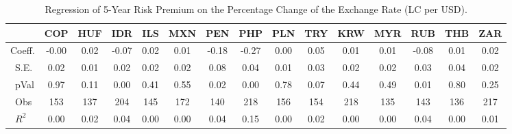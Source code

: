 \begin{table}
	\centering
\begin{tabular}{l|cccccccccccccc}
\toprule
&\textbf{COP}&\textbf{HUF}&\textbf{IDR}&\textbf{ILS}&\textbf{MXN}&\textbf{PEN}&\textbf{PHP}&\textbf{PLN}&\textbf{TRY}&\textbf{KRW}&\textbf{MYR}&\textbf{RUB}&\textbf{THB}&\textbf{ZAR}\\\midrule
{ Coeff.}&-0.00&0.02&-0.07&0.02&0.01&-0.18&-0.27&0.00&0.05&0.01&0.01&-0.08&0.01&0.02\\\
{S.E.}&0.02&0.01&0.02&0.02&0.02&0.08&0.04&0.01&0.03&0.02&0.02&0.03&0.04&0.02\\\
{pVal}&0.97&0.11&0.00&0.41&0.55&0.02&0.00&0.78&0.07&0.44&0.49&0.01&0.80&0.25\\\
{Obs}&153&137&204&145&172&140&218&156&154&218&135&143&136&217\\\
{$R^2$}&0.00&0.02&0.04&0.00&0.00&0.04&0.15&0.00&0.02&0.00&0.00&0.04&0.00&0.01\\ \bottomrule
\end{tabular}
\\
\caption{Regression of 5-Year Risk Premium on the Percentage Change of the Exchange Rate (LC per USD).}
\label{tab:rp_reg_rfx}
\end{table}